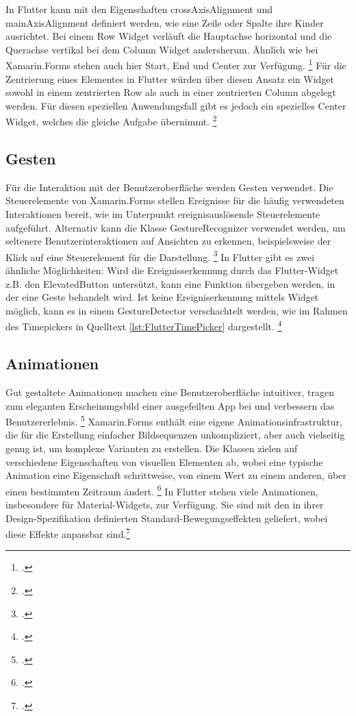 In Flutter kann mit den Eigenschaften \glq crossAxisAlignment\grq{} und \glq mainAxisAlignment\grq{} definiert werden, wie eine Zeile oder Spalte ihre Kinder ausrichtet. Bei einem \glq Row\grq{} Widget verläuft die Hauptachse horizontal und die Querachse vertikal bei dem \glq Column\grq{} Widget andersherum. Ähnlich wie bei Xamarin.Forms stehen auch hier \glq Start\grq ,  \glq End\grq{} und \glq Center\grq{} zur Verfügung. \footcite[Vgl.][Abgerufen am \today]{GoogleAlignWidgets}  Für die Zentrierung eines Elementes in Flutter würden über diesen Ansatz ein Widget sowohl in einem zentrierten \glq Row\grq{} als auch in einer zentrierten \glq Column\grq{} abgelegt werden.  Für diesen speziellen Anwendungsfall gibt es jedoch ein spezielles \glq Center\grq{} Widget, welches die gleiche Aufgabe übernimmt. \footcite[Vgl.][Abgerufen am \today]{GoogleCenter} 

\subsection{Gesten}
Für die Interaktion mit der Benutzeroberfläche werden Gesten verwendet.  Die Steuerelemente von Xamarin.Forms stellen Ereignisse für die häufig verwendeten Interaktionen bereit, wie im Unterpunkt ereignisauslösende Steuerelemente aufgeführt.  Alternativ kann die Klasse \glq GestureRecognizer\grq{}  verwendet werden, um seltenere Benutzerinteraktionen auf Ansichten zu erkennen, beispielsweise der Klick auf eine Steuerelement für die Darstellung.  \footcite[Vgl.][Abgerufen am \today]{MicrosoftGesten2020} 
In Flutter gibt es zwei ähnliche Möglichkeiten: Wird die Ereignisserkennung durch das Flutter-Widget z.B. den \glq ElevatedButton\grq{} untersützt,  kann eine Funktion übergeben werden,  in der eine Geste behandelt wird.  Ist keine Ereigniserkennung mittels Widget möglich,  kann es in einem \glq GestureDetector\grq{} verschachtelt werden, wie im Rahmen des \glq Timepickers\grq{} in Quelltext \ref{lst:FlutterTimePicker} dargestellt. \footcite[Vgl.][Abgerufen am \today]{GoogleGesture2020} 

\subsection{Animationen}
Gut gestaltete Animationen machen eine Benutzeroberfläche intuitiver, tragen zum eleganten Erscheinungsbild einer ausgefeilten App bei und verbessern das Benutzererlebnis.  \footcite[Vgl.][Abgerufen am \today]{GoogleFlutterAnimations2020} 
Xamarin.Forms enthält eine eigene Animationsinfrastruktur,  die für die Erstellung einfacher Bildsequenzen unkompliziert,  aber auch vielseitig genug ist,  um komplexe Varianten zu erstellen.  Die Klassen zielen auf verschiedene Eigenschaften von visuellen Elementen ab, wobei eine typische Animation eine Eigenschaft schrittweise, von einem Wert zu einem anderen, über einen bestimmten Zeitraum ändert. \footcite[Vgl.][Abgerufen am \today]{Microsoftanimations2020} 
In Flutter stehen viele Animationen,  insbesondere für Material-Widgets,  zur Verfügung.  Sie sind mit den in ihrer Design-Spezifikation definierten Standard-Bewegungseffekten geliefert,  wobei diese Effekte anpassbar sind.\footcite[Vgl.][Abgerufen am \today]{GoogleFlutterAnimations2020} 

